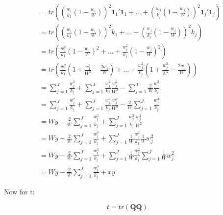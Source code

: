 \begin{equation}
    \begin{split}
        & = tr\left( \left(\frac{w_1}{k_1}(1 - \frac{w_1}{W})\right)^2\mathbf{1}_1'\mathbf{1}_1  + ... + (\frac{w_j}{k_j}(1 - \frac{w_j}{W}))^2\mathbf{1}_j'\mathbf{1}_j \right) \\
         & = tr\left( \left(\frac{w_1}{k_1}(1 - \frac{w_1}{W})\right)^2k_1 + ... + (\frac{w_j}{k_j}(1 - \frac{w_j}{W}))^2k_j\right) \\
        & = tr\left(\frac{w_1^2}{k_1}(1 - \frac{w_1}{W})^2  + ... + \frac{w_j^2}{k_j}(1 - \frac{w_j}{W})^2 \right) \\
        & = tr\left(\frac{w_1^2}{k_1}(1 + \frac{w_1^2}{W^2}- \frac{2w_1}{W})  + ... + \frac{w_j^2}{k_j}(1 + \frac{w_j^2}{W^2} - \frac{2w_j}{W}) \right) \\
        &= \sum_{j=1}^J \frac{w_j^2}{k_j} + \sum_{j=1}^J \frac{w_j^2}{k_j}\frac{w_j^2}{W^2} - \sum_{j=1}^J \frac{2}{W}\frac{w_j^3}{k_j} \\
        &= \sum_{j=1}^J \frac{w_j^2}{k_j} + \sum_{j=1}^J \frac{w_j^2}{k_j}\frac{w_j^2}{W^2} -  \frac{2}{W}\sum_{j=1}^J\frac{w_j^3}{k_j} \\
         &= Wy  -  \frac{2}{W}\sum_{j=1}^J\frac{w_j^3}{k_j} + \sum_{j=1}^J \frac{w_j^2}{k_j}\frac{w_j^2}{W^2}  \\
         &= Wy  -  \frac{2}{W}\sum_{j=1}^J\frac{w_j^3}{k_j} + \sum_{j=1}^J \frac{1}{W} \frac{w_j^2}{k_j}\frac{1}{W}w_j^2  \\
         &= Wy  -  \frac{2}{W}\sum_{j=1}^J\frac{w_j^3}{k_j} + \sum_{j=1}^J \frac{1}{W} \frac{w_j^2}{k_j }\sum_{j=1}^J\frac{1}{W}w_j^2  \\
         &= Wy  -  \frac{2}{W}\sum_{j=1}^J\frac{w_j^3}{k_j} + xy
    \end{split}
    \nonumber
\end{equation}

Now for t: 

\begin{equation}
    t = tr(\mathbf{Q}\mathbf{Q}) 
    \nonumber
\end{equation}

